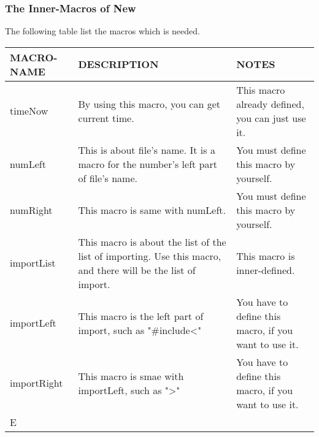 \documentclass[UTF8]{article} %
\begin{document}
\subsubsection{The Inner-Macros of New}
The following table list the macros which is needed.
\begin{center}
    \begin{tabular}{|p{}|p{}|p{}|}
    \hline \rule[-2ex]{0pt}{5.5ex} MACRO-NAME & DESCRIPTION & NOTES \\ 
    \hline \rule[-2ex]{0pt}{5.5ex} timeNow & By using this macro, you can get current time. & This macro already defined, you can just use it. \\ 
    \hline \rule[-2ex]{0pt}{5.5ex} numLeft & This is about file's name. It is a macro for the number's left part of file's name. & You must define this macro by yourself. \\ 
    \hline \rule[-2ex]{0pt}{5.5ex} numRight & This macro is same with numLeft. & You must define this macro by yourself. \\ 
    \hline \rule[-2ex]{0pt}{5.5ex} importList & This macro is about the list of the list of importing. Use this macro, and there will be the list of import.   & This macro is inner-defined. \\ 
    \hline \rule[-2ex]{0pt}{5.5ex} importLeft & This macro is the left part of import, such as "\#include<" & You have to define this macro, if you want to use it.  \\ 
    \hline \rule[-2ex]{0pt}{5.5ex} importRight & This macro is smae with importLeft, such as ">" & You have to define this macro, if you want to use it. \\ 
    \hline \rule[-2ex]{0pt}{5.5ex} E
\end{tabular} 

\end{center}
\end{document}
